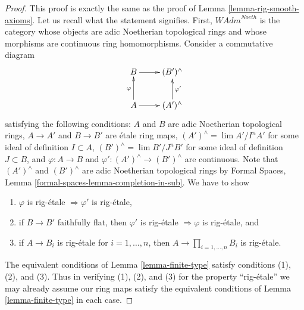 \documentclass{stacks-project}
\theoremstyle{plain}
\theoremstyle{definition}
\theoremstyle{remark}
\numberwithin{equation}{subsection}
\def\lim{\mathop{\mathrm{lim}}\nolimits}
\begin{document}
\begin{proof}
This proof is exactly the same as the proof of
Lemma \ref{lemma-rig-smooth-axioms}.
Let us recall what the statement signifies. First, 
$\textit{WAdm}^{Noeth}$ is the category whose objects are
adic Noetherian topological rings and whose morphisms are
continuous ring homomorphisms. Consider a commutative diagram
$$
\xymatrix{
B \ar[r] & (B')^\wedge \\
A \ar[r] \ar[u]^\varphi & (A')^\wedge \ar[u]_{\varphi'}
}
$$
satisfying the following conditions:
$A$ and $B$ are adic Noetherian topological rings,
$A \to A'$ and $B \to B'$ are \'etale ring maps,
$(A')^\wedge = \lim A'/I^nA'$ for some ideal of definition $I \subset A$,
$(B')^\wedge = \lim B'/J^nB'$ for some ideal of definition $J \subset B$, and
$\varphi : A \to B$ and $\varphi' : (A')^\wedge \to (B')^\wedge$
are continuous. Note that $(A')^\wedge$ and $(B')^\wedge$ are
adic Noetherian topological rings by
Formal Spaces, Lemma \ref{formal-spaces-lemma-completion-in-sub}.
We have to show
\begin{enumerate}
\item $\varphi$ is rig-\'etale $\Rightarrow \varphi'$ is rig-\'etale,
\item if $B \to B'$ faithfully flat, then $\varphi'$ is rig-\'etale
$\Rightarrow \varphi$ is rig-\'etale, and
\item if $A \to B_i$ is rig-\'etale for $i = 1, \ldots, n$, then
$A \to \prod_{i = 1, \ldots, n} B_i$ is rig-\'etale.
\end{enumerate}
The equivalent conditions of Lemma \ref{lemma-finite-type} satisfy
conditions (1), (2), and (3).
Thus in verifying (1), (2), and (3) for the property
``rig-\'etale'' we may already assume our ring maps satisfy
the equivalent conditions of Lemma \ref{lemma-finite-type}
in each case.


\end{proof}
\end{document}

